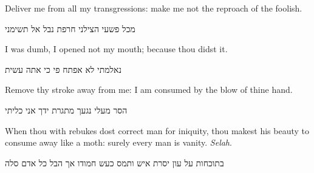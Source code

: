 \documentclass[dark]{gsf-presentation}
\begin{document}
\begin{frame}
	\LARGE
	\begin{english}
		\begin{center}
			Deliver me from all my transgressions:
			make me not the reproach of the foolish.
		\end{center}
	\end{english}

	\begin{hebrew}
		\begin{center}
			מכל פשעי הצילני חרפת נבל אל תשימני
		\end{center}
	\end{hebrew}
\end{frame}

\begin{frame}
	\LARGE
	\begin{english}
		\begin{center}
			I was dumb, I opened not my mouth;
			because thou didst it.
		\end{center}
	\end{english}

	\begin{hebrew}
		\begin{center}
			נאלמתי לא אפתח פי כי אתה עשית
		\end{center}
	\end{hebrew}
\end{frame}

\begin{frame}
	\LARGE
	\begin{english}
		\begin{center}
			Remove thy stroke away from me: I am
			consumed by the blow of thine hand.
		\end{center}
	\end{english}

	\begin{hebrew}
		\begin{center}
			הסר מעלי נגעך מתגרת ידך אני כליתי
		\end{center}
	\end{hebrew}
\end{frame}

\begin{frame}
	\LARGE
	\begin{english}
		\begin{center}
			When thou with rebukes dost correct man
			for iniquity, thou makest his beauty to
			consume away like a moth: surely every man
			is vanity. \textit{Selah}.
		\end{center}
	\end{english}

	\begin{hebrew}
		\begin{center}
			בתוכחות על עון יסרת איש ותמס כעש
			חמודו אך הבל כל אדם סלה
		\end{center}
	\end{hebrew}
\end{frame}
\end{document}
